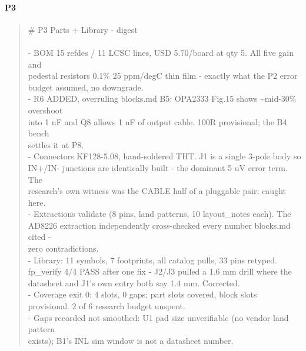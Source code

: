 \documentclass[11pt,a4paper]{article}
\begin{document}
\paragraph*{P3}
\begin{quote}\small\ttfamily\raggedright
\# P3 Parts + Library - digest\\
~\\
- BOM 15 refdes / 11 LCSC lines, USD 5.70/board at qty 5. All five gain and\\
  pedestal resistors 0.1\% 25 ppm/degC thin film - exactly what the P2 error\\
  budget assumed, no downgrade.\\
- R6 ADDED, overruling blocks.md B5: OPA2333 Fig.15 shows \textasciitilde{}mid-30\% overshoot\\
  into 1 nF and Q8 allows 1 nF of output cable. 100R provisional; the B4 bench\\
  settles it at P8.\\
- Connectors KF128-5.08, hand-soldered THT. J1 is a single 3-pole body so\\
  IN+/IN- junctions are identically built - the dominant 5 uV error term. The\\
  research's own witness was the CABLE half of a pluggable pair; caught here.\\
- Extractions validate (8 pins, land patterns, 10 layout\_notes each). The\\
  AD8226 extraction independently cross-checked every number blocks.md cited -\\
  zero contradictions.\\
- Library: 11 symbols, 7 footprints, all catalog pulls, 33 pins retyped.\\
  fp\_verify 4/4 PASS after one fix - J2/J3 pulled a 1.6 mm drill where the\\
  datasheet and J1's own entry both say 1.4 mm. Corrected.\\
- Coverage exit 0: 4 slots, 0 gaps; part slots covered, block slots\\
  provisional. 2 of 6 research budget unspent.\\
- Gaps recorded not smoothed: U1 pad size unverifiable (no vendor land pattern\\
  exists); B1's INL sim window is not a datasheet number.
\end{quote}
\end{document}
